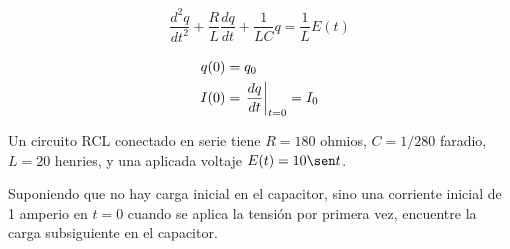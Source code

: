 {}
\begin{align*}
	\dfrac{d^{2}q}{dt^{2}} 
	+\dfrac{R}{L}\dfrac{dq}{dt}
	+\dfrac{1}{LC}q = 
	\dfrac{1}{L}E(t)
\end{align*}


{}
\begin{align*}
	q(0) &= q_{0}\\
	I(0) &= \left. \dfrac{dq}{dt} \right|_{t=0}=I_{0}
\end{align*}


{}
\begin{problema}
	Un circuito RCL conectado en serie tiene $R = 180$ ohmios, $C = 1/280$ faradio, $L = 20$ henries, y una aplicada
	voltaje $E(t) = 10 \sen t$. 
	
	
	Suponiendo que no hay carga inicial en el capacitor, sino una corriente inicial de 1 amperio en
	$t = 0$ cuando se aplica la tensión por primera vez, encuentre la carga subsiguiente en el capacitor.
\end{problema}



